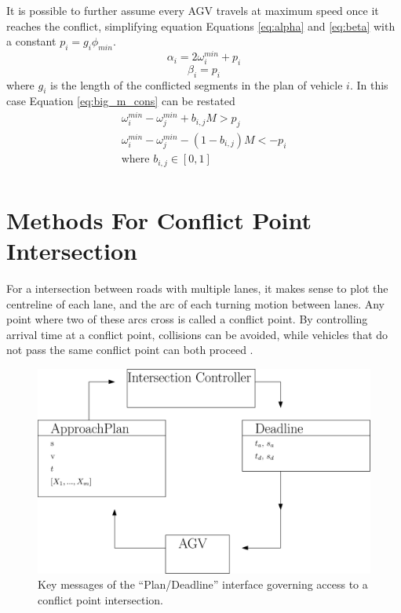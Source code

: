 \documentclass[]{article}
\begin{document}
It is possible to further assume every AGV travels at maximum speed once it reaches the conflict, simplifying equation Equations \ref{eq:alpha} and \ref{eq:beta} with a constant $p_i = g_i \phi_{min}$. 
\begin{equation}
	\alpha_i = 2\omega_i^{min} + p_i
\end{equation}
\begin{equation}
	\beta_i = p_i
\end{equation}
where $g_i$ is the length of the conflicted segments in the plan of vehicle $i$. In this case Equation \ref{eq:big_m_cons} can be restated 
\begin{equation}
	\begin{array}{cc}
		\omega_i^{min} - \omega_j^{min} + b_{i,j}M > p_j \\
		\omega_i^{min} - \omega_j^{min}  - (1-b_{i,j})M < -p_i \\
		\textrm{where } b_{i,j}\in[0,1] \\
	\end{array}
	\label{eq:minlp}
\end{equation}

\section{Methods For Conflict Point Intersection}
For a intersection between roads with multiple lanes, it makes sense to plot the centreline of each lane, and the arc of each turning motion between lanes. Any point where two of these arcs cross is called a conflict point. By controlling arrival time at a conflict point, collisions can be avoided, while vehicles that do not pass the same conflict point can both proceed \cite{Levin2017}.

\begin{figure}[ht]
	\centering
	\includegraphics[width=0.9\linewidth]{plan_deadline_interface.eps}
	\caption{Key messages of the ``Plan/Deadline'' interface governing access to a conflict point intersection.}
	\label{fig:plan_deadline_interface}
\end{figure}
\end{document}
